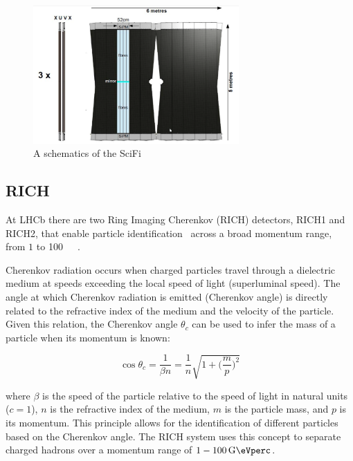 \begin{figure}
    \centering
    \includegraphics[width=0.7\textwidth]{figures/scifi.png}
    \caption{A schematics of the SciFi}
    \label{fig:scifi}
\end{figure}


\subsection{RICH}
At LHCb there are two Ring Imaging Cherenkov (RICH) detectors, RICH1 and RICH2, that enable particle identification~\cite{LHCb:2013urp} across a broad momentum range, from $1$ to \SI[per-mode=symbol]{100}{\giga\eVperc}~\cite{Adinolfi_2013}.

Cherenkov radiation occurs when charged particles travel through a dielectric medium at speeds exceeding the local speed of light (superluminal speed). The angle at which Cherenkov radiation is emitted (Cherenkov angle) is directly related to the refractive index of the medium and the velocity of the particle. Given this relation, the Cherenkov angle $\theta_c$ can be used to infer the mass of a particle when its momentum is known:

\begin{equation}
    \cos\theta_c=\frac{1}{\beta n} = \frac{1}{n}\sqrt{1+\biggl(\frac{m}{p}\biggr)^2}
\end{equation}

where $\beta$ is the speed of the particle relative to the speed of light in natural units ($c=1$), $n$ is the refractive index of the medium, $m$ is the particle mass, and $p$ is its momentum.
This principle allows for the identification of different particles based on the Cherenkov angle. The RICH system uses this concept to separate charged hadrons over a momentum range of $1-\SI[per-mode=symbol]{100}{\giga\eVperc}$.


